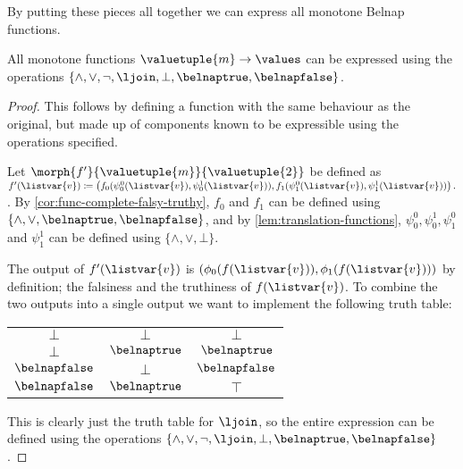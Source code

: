 By putting these pieces all together we can express all monotone Belnap
functions.

\begin{theorem}
    \label{thm:belnap-complete}
    All monotone functions \(\valuetuple{m} \to \values\) can be expressed
    using the operations \(
    \{\land,\lor,\neg,\ljoin,\bot,\belnaptrue,\belnapfalse\}
    \).
\end{theorem}
\begin{proof}
    This follows by defining a function with the same behaviour as the original,
    but made up of components known to be expressible using the operations
    specified.

    Let \(\morph{f^\prime}{\valuetuple{m}}{\valuetuple{2}}\) be defined as
    \(
    f^\prime(\listvar{v})
    \coloneqq
    \left(
    f_0(\psi^0_0(\listvar{v}), \psi^1_0(\listvar{v})),
    f_1(\psi^0_1(\listvar{v}), \psi^1_1(\listvar{v}))
    \right).
    \).
    By \cref{cor:func-complete-falsy-truthy}, \(f_0\) and \(f_1\) can be defined
    using \(\{\land,\lor,\belnaptrue,\belnapfalse\}\), and by
    \cref{lem:translation-functions}, \(\psi^0_0,\psi^1_0,\psi^0_1\) and
    \(\psi^1_1\) can be defined using \(\{\land,\lor,\bot\}\).

    The output of \(f^\prime(\listvar{v})\) is \(
    \left(\phi_0(f(\listvar{v})), \phi_1(f(\listvar{v}))\right)
    \) by definition; the falsiness and the truthiness of \(f(\listvar{v})\).
    To combine the two outputs into a single output we want to
    implement the following truth table:

    \begin{center}
        \begin{tabular}{cc|c}
            \(\bot\)         & \(\bot\)        & \(\bot\)         \\
            \(\bot\)         & \(\belnaptrue\) & \(\belnaptrue\)  \\
            \(\belnapfalse\) & \(\bot\)        & \(\belnapfalse\) \\
            \(\belnapfalse\) & \(\belnaptrue\) & \(\top\)
        \end{tabular}
    \end{center}

    This is clearly just the truth table for \(\ljoin\), so the entire
    expression can be defined using the operations \(
    \{\land,\lor,\neg,\ljoin,\bot,\belnaptrue,\belnapfalse\}
    \).
\end{proof}

